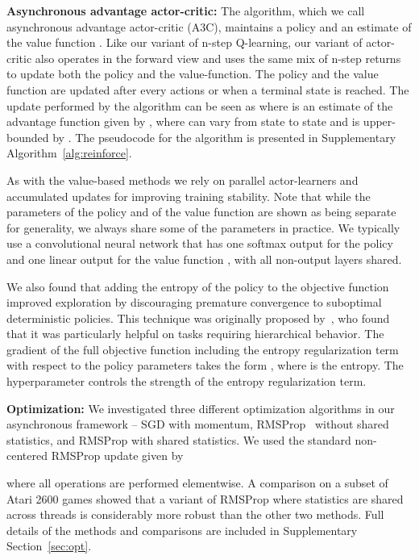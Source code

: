 \documentclass{article} \usepackage{times}
\begin{document}
\textbf{Asynchronous advantage actor-critic:}
The algorithm, which we call asynchronous advantage actor-critic (A3C), maintains a policy  and an estimate of the value function .
Like our variant of n-step Q-learning, our variant of actor-critic also operates in the forward view and uses the same mix of n-step returns to update both the policy and the value-function.
The policy and the value function are updated after every  actions or when a terminal state is reached.
The update performed by the algorithm can be seen as  where  is an estimate of the advantage function given by , where  can vary from state to state and is upper-bounded by .
The pseudocode for the algorithm is presented in Supplementary Algorithm~\ref{alg:reinforce}.


As with the value-based methods we rely on parallel actor-learners and accumulated updates for improving training stability.
Note that while the parameters  of the policy and  of the value function are shown as being separate for generality, we always share some of the parameters in practice.
We typically use a convolutional neural network that has one softmax output for the policy  and one linear output for the value function , with all non-output layers shared.

We also found that adding the entropy of the policy  to the objective function improved exploration by discouraging premature convergence to suboptimal deterministic policies.
This technique was originally proposed by~\citep{williams1991function}, who found that it was particularly helpful on tasks requiring hierarchical behavior.
The gradient of the full objective function including the entropy regularization term with respect to the policy parameters takes the form
,
where  is the entropy.  The hyperparameter  controls the strength of the entropy regularization term.


\textbf{Optimization:}
We investigated three different optimization algorithms in our asynchronous framework -- SGD with momentum, RMSProp~\citep{tieleman2012lecture} without shared statistics, and RMSProp with shared statistics.
We used the standard non-centered RMSProp update given by

where all operations are performed elementwise.
A comparison on a subset of Atari 2600 games showed that a variant of RMSProp where statistics  are shared across threads is considerably more robust than the other two methods.
Full details of the methods and comparisons are included in Supplementary Section~\ref{sec:opt}.
 \vspace{-0.1cm}
\end{document}
